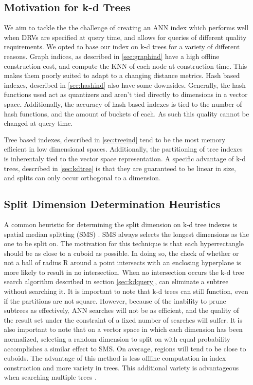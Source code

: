 \subsection{Motivation for k-d Trees}

We aim to tackle the the challenge of creating an ANN index which performs well when DRVs are specified at query time, and allows for queries of different quality requirements.  We opted to base our index on k-d trees for a variety of different reasons.  Graph indices, as described in \ref{sec:graphind} have a high offline construction cost, and compute the KNN of each node at construction time.  This makes them poorly suited to adapt to a changing distance metrics.  Hash based indexes, described in \ref{sec:hashind} also have some downsides.  Generally, the hash functions used act as quantizers and aren't tied directly to dimensions in a vector space.  Additionally, the accuracy of hash based indexes is tied to the number of hash functions, and the amount of buckets of each.  As such this quality cannot be changed at query time.

Tree based indexes, described in \ref{sec:treeind} tend to be the most memory efficient in low dimensional spaces.  Additionally, the partitioning of tree indexes is inherentaly tied to the vector space representation.  A specific advantage of k-d trees, described in \ref{sec:kdtree} is that they are guaranteed to be linear in size, and splits can only occur orthogonal to a dimension.

\subsection{Split Dimension Determination Heuristics}
\label{section:splitdim}

A common heuristic for determining the split dimension on k-d tree indexes is spatial median splitting (SMS) \citep{zhou2008real} \citep{wald2006building}.  SMS always selects the longest dimensions as the one to be split on.  The motivation for this technique is that each hyperrectangle should be as close to a cuboid as possible.  In doing so, the check of whether or not a ball of radius R around a point intersects with an enclosing hyperplane is more likely to result in no intersection.  When no intersection occurs the k-d tree search algorithm described in section \ref{sec:kdquery}, can eliminate a subtree without searching it.  It is important to note that k-d trees can still function, even if the partitions are not square.  However, because of the inability to prune subtrees as effectively, ANN searches will not be as efficient, and the quality of the result set under the constraint of a fixed number of searches will suffer.  It is also important to note that on a vector space in which each dimension has been normalized, selecting a random dimension to split on with equal probability accomplishes a similar effect to SMS.  On average, regions will tend to be close to cuboids. The advantage of this method is less offline computation in index construction and more variety in trees.  This additional variety is advantageous when searching multiple trees \citep{flann_pami_2014}.

